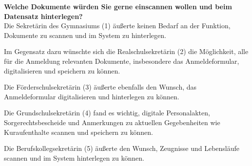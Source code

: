 \textbf{Welche Dokumente würden Sie gerne einscannen wollen und beim Datensatz hinterlegen?}\\
Die Sekretärin des Gymnasiums (1) äußerte keinen Bedarf an der Funktion, Dokumente zu scannen und im System zu hinterlegen.

Im Gegensatz dazu wünschte sich die Realschulsekretärin (2) die Möglichkeit, alle für die Anmeldung relevanten Dokumente, insbesondere das Anmeldeformular, digitalisieren und speichern zu können.

Die Förderschulsekretärin (3) äußerte ebenfalls den Wunsch, das Anmeldeformular digitalisieren und hinterlegen zu können.

Die Grundschulsekretärin (4) fand es wichtig, digitale Personalakten, Sorgerechtsbescheide und Anmerkungen zu aktuellen Gegebenheiten wie Kuraufenthalte scannen und speichern zu können.

Die Berufskollegsekretärin (5) äußerte den Wunsch, Zeugnisse und Lebensläufe scannen und im System hinterlegen zu können.